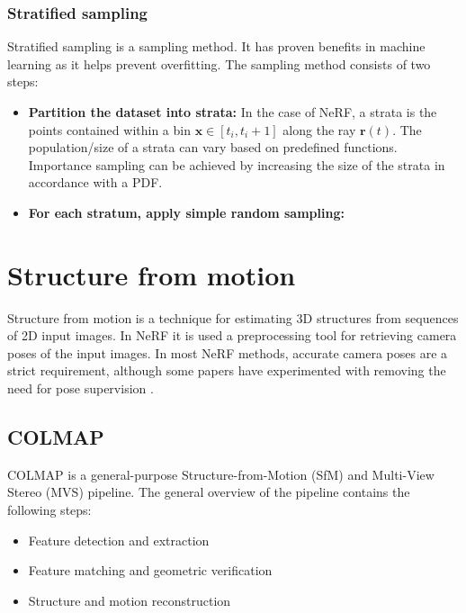 
\subsubsection{Stratified sampling} \label{sec:stratifiedsampling}
Stratified sampling is a sampling method. It has proven benefits in machine learning as it helps prevent overfitting. The sampling method consists of two steps:

\begin{itemize}
    \item \textbf{Partition the dataset into strata:} In the case of NeRF, a strata is the points contained within a bin $\pmb{x} \in [t_i, t_i+1]$ along the ray $\pmb{r}(t)$. The population/size of a strata can vary based on predefined functions. Importance sampling can be achieved by increasing the size of the strata in accordance with a PDF.
    \item \textbf{For each stratum, apply simple random sampling:} 
\end{itemize}




\section{Structure from motion} \label{sec:sfm}
Structure from motion is a technique for estimating 3D structures from sequences of 2D input images. In NeRF it is used a preprocessing tool for retrieving camera poses of the input images. In most NeRF methods, accurate camera poses are a strict requirement, although some papers have experimented with removing the need for pose supervision \cite{lin_barf_2021}.

\subsection{COLMAP} \label{sec:colmap}
COLMAP is a general-purpose Structure-from-Motion (SfM) \cite{schoenberger2016sfm} and Multi-View Stereo (MVS) \cite{schoenberger2016mvs} pipeline. The general overview of the pipeline contains the following steps:
\begin{itemize}
    \item Feature detection and extraction
    \item Feature matching and geometric verification
    \item Structure and motion reconstruction
\end{itemize}

